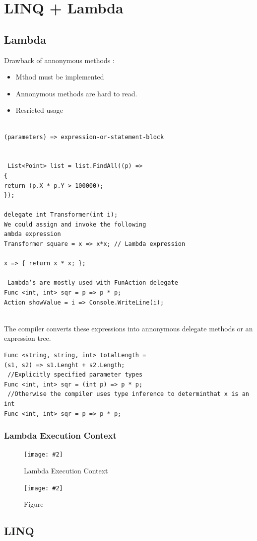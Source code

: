 \documentclass[a4paper,10pt]{scrartcl}
\newcommand{\pic}[2][Figure]{
  \begin{figure}[h!]
   \centering
   \texttt{[image: \#2]}
   \caption{{#1}}
  \end{figure}
}
\begin{document}
\section{LINQ + Lambda}
\subsection{Lambda}
Drawback of annonymous methods :
\begin{itemize}
 \item Mthod must be implemented
 \item Annonymous methods are hard to read.
 \item Resricted usage
\end{itemize}


\begin{lstlisting}[caption=some basic lambda examples]

(parameters) => expression-or-statement-block


 List<Point> list = list.FindAll((p) =>
{
return (p.X * p.Y > 100000);
});

delegate int Transformer(int i);
We could assign and invoke the following
ambda expression
Transformer square = x => x*x; // Lambda expression

x => { return x * x; };

 Lambda’s are mostly used with FunAction delegate
Func <int, int> sqr = p => p * p;
Action showValue = i => Console.WriteLine(i);


\end{lstlisting}

The compiler converts these expressions into annonymous delegate methods or an expression tree.

\begin{lstlisting}[caption=lambdas and functions]
 Func <string, string, int> totalLength =
(s1, s2) => s1.Lenght + s2.Length;
 //Explicitly specified parameter types
Func <int, int> sqr = (int p) => p * p;
 //Otherwise the compiler uses type inference to determinthat x is an int
Func <int, int> sqr = p => p * p;

\end{lstlisting}

\subsubsection{Lambda Execution Context}
\pic[Lambda Execution Context]{lambda1.png}
\pic{lambda2.png}

\subsection{LINQ}
\end{document}
